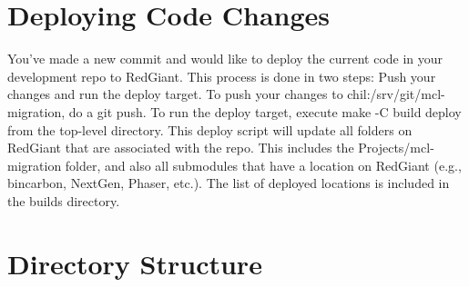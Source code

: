 \documentclass[12pt]{article} %
\begin{document}
\section{Deploying Code Changes}

You've made a new commit and would like to deploy the current code in your development repo to RedGiant.
This process is done in two steps: Push your changes and run the deploy target.
To push your changes to chil:/srv/git/mcl-migration, do a git push.
To run the deploy target, execute make -C build deploy from the top-level directory.
This deploy script will update all folders on RedGiant that are associated with the repo.
This includes the Projects/mcl-migration folder, and also all submodules that have a location on RedGiant (e.g., bincarbon, NextGen, Phaser, etc.).
The list of deployed locations is included in the builds directory.

\section{Directory Structure} %
\end{document}
